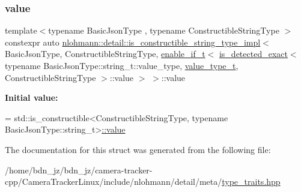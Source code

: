 \subsubsection{\texorpdfstring{value}{value}}
{\footnotesize\ttfamily template$<$typename Basic\+Json\+Type , typename Constructible\+String\+Type $>$ \\
constexpr auto \hyperlink{structnlohmann_1_1detail_1_1is__constructible__string__type__impl}{nlohmann\+::detail\+::is\+\_\+constructible\+\_\+string\+\_\+type\+\_\+impl}$<$ Basic\+Json\+Type, Constructible\+String\+Type, \hyperlink{namespacenlohmann_1_1detail_a02bcbc878bee413f25b985ada771aa9c}{enable\+\_\+if\+\_\+t}$<$ \hyperlink{namespacenlohmann_1_1detail_a7542b4dbac07817fd4849ecfa4619def}{is\+\_\+detected\+\_\+exact}$<$ typename Basic\+Json\+Type\+::string\+\_\+t\+::value\+\_\+type, \hyperlink{namespacenlohmann_1_1detail_af91beae90c2fb0f931079b3d50a343bc}{value\+\_\+type\+\_\+t}, Constructible\+String\+Type $>$\+::value $>$ $>$\+::value\hspace{0.3cm}{\ttfamily [static]}}

{\bfseries Initial value\+:}
\begin{DoxyCode}
=
        std::is\_constructible<ConstructibleStringType,
        \textcolor{keyword}{typename} BasicJsonType::string\_t>\hyperlink{structnlohmann_1_1detail_1_1is__constructible__string__type__impl_3_01_basic_json_type_00_01_con83e8ebfe9593f851a60fdb8360df1512_a3aeae0de0fc37bd5acf3c9d39b132678}{::value}
\end{DoxyCode}


The documentation for this struct was generated from the following file\+:\begin{DoxyCompactItemize}
\item 
/home/bdn\+\_\+jz/bdn\+\_\+jz/camera-\/tracker-\/cpp/\+Camera\+Tracker\+Linux/include/nlohmann/detail/meta/\hyperlink{type__traits_8hpp}{type\+\_\+traits.\+hpp}\end{DoxyCompactItemize}
